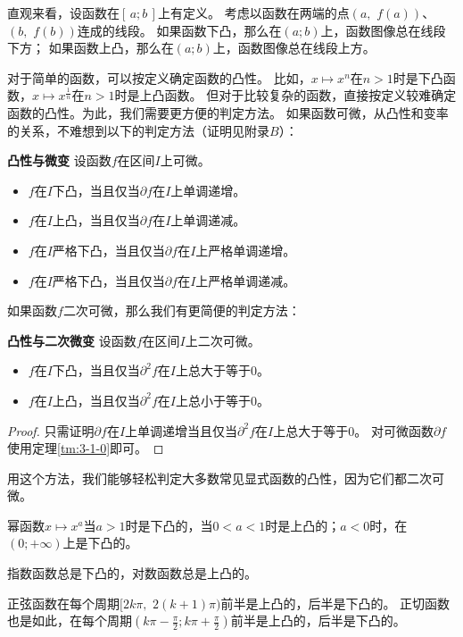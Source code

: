 \documentclass[12pt,UTF8,fontset=none]{ctexbook}
\begin{document}
直观来看，设函数在$[\,a; b\,]$上有定义。
考虑以函数在两端的点$(a,\,\, f(a))$、$(b,\,\, f(b))$连成的线段。
如果函数下凸，那么在$(a;b)$上，函数图像总在线段下方；
如果函数上凸，那么在$(a;b)$上，函数图像总在线段上方。

对于简单的函数，可以按定义确定函数的凸性。
比如，$x\mapsto x^n$在$n>1$时是下凸函数，$x\mapsto x^\frac{1}{n}$在$n>1$时是上凸函数。
但对于比较复杂的函数，直接按定义较难确定函数的凸性。为此，我们需要更方便的判定方法。
如果函数可微，从凸性和变率的关系，不难想到以下的判定方法（证明见附录$B$）：

\begin{tm}{\textbf{凸性与微变}}
    设函数$f$在区间$I$上可微。
    \begin{itemize}
        \item $f$在$I$下凸，当且仅当$\partial f$在$I$上单调递增。
        \item $f$在$I$上凸，当且仅当$\partial f$在$I$上单调递减。
        \item $f$在$I$严格下凸，当且仅当$\partial f$在$I$上严格单调递增。
        \item $f$在$I$严格下凸，当且仅当$\partial f$在$I$上严格单调递减。
    \end{itemize}
\end{tm}

如果函数$f$二次可微，那么我们有更简便的判定方法：
\begin{tm}\textbf{凸性与二次微变}
    设函数$f$在区间$I$上二次可微。
    \begin{itemize}
        \item $f$在$I$下凸，当且仅当$\partial^2 f$在$I$上总大于等于$0$。
        \item $f$在$I$上凸，当且仅当$\partial^2 f$在$I$上总小于等于$0$。
    \end{itemize}
\end{tm}

\begin{proof}
    只需证明$\partial f$在$I$上单调递增当且仅当$\partial^2 f$在$I$上总大于等于$0$。
    对可微函数$\partial f$使用定理\ref{tm:3-1-0}即可。
\end{proof}

用这个方法，我们能够轻松判定大多数常见显式函数的凸性，因为它们都二次可微。

幂函数$x\mapsto x^a$当$a>1$时是下凸的，当$0<a<1$时是上凸的；$a<0$时，在$(0;+\infty)$上是下凸的。

指数函数总是下凸的，对数函数总是上凸的。

正弦函数在每个周期$[2k\pi, \,\, 2(k+1)\pi)$前半是上凸的，后半是下凸的。
正切函数也是如此，在每个周期$(k\pi-\frac{\pi}{2}; k\pi+\frac{\pi}{2})$前半是上凸的，后半是下凸的。
\end{document}

